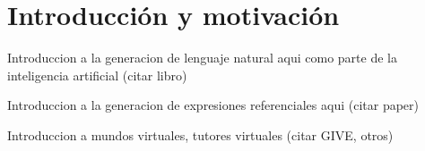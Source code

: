 \section{Introducci\'on y motivaci\'on}
\label{intro}

Introduccion a la generacion de lenguaje natural aqui como parte de la inteligencia artificial (citar libro)

Introduccion a la generacion de expresiones referenciales aqui (citar paper)

Introduccion a mundos virtuales, tutores virtuales (citar GIVE, otros)



